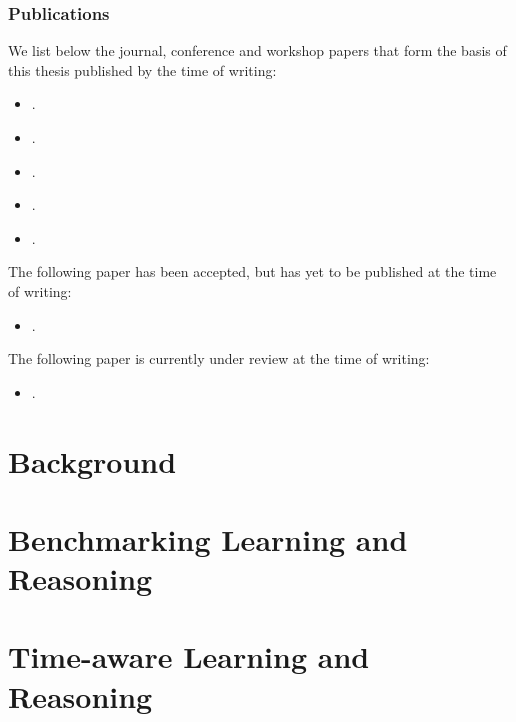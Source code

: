 \documentclass[a4paper,twoside,openright]{book}
\theoremstyle{plain}
\theoremstyle{definition}
\begin{document}
\section{Publications}


We list below the journal, conference and workshop papers that form the basis of this thesis published by the time of writing:
%
\begin{itemize}
\nobibliography*
    \item \cite{lorello2023challenge} .
    \item \cite{manhaeve2024benchmarking} .
    \item \cite{lorello2025kandy} .
    \item \cite{lorello2024continual} .
    \item \cite{lorello2025neuro} .
 \end{itemize}
%
The following paper has been accepted, but has yet to be published at the time of writing:
%
\begin{itemize}
	\nobibliography*
	\item \cite{lorello2025ansya} .
\end{itemize}
%
The following paper is currently under review at the time of writing:
%
\begin{itemize}
\nobibliography*
    \item \cite{lorello2025ltlzinc} .
\end{itemize}

\part{Background}






\part{Benchmarking Learning and Reasoning}




\part{Time-aware Learning and Reasoning}





\end{document}
